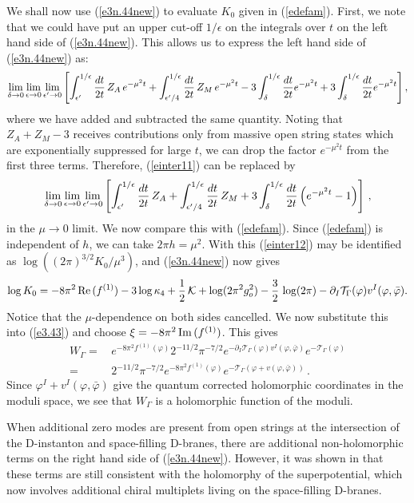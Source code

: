 \documentclass[12pt,a4paper]{article}
\newcommand{\be}{\begin{equation}}
\newcommand{\ee}{\end{equation}}
\newcommand{\refb}[1]{(\ref{#1})}
\newcommand{\p}{\partial}
\def\Im{\,{\rm Im}\,}
\def\Re{\,{\rm Re}\,}
\def\({\left(}
\def\){\right)}
\def\[{\left[}
\def\]{\right]}
\newcommand{\eps}{\epsilon}
\newcommand{\vp}{\varphi}
\newcommand{\cK}{\mathcal{K}}
\newcommand{\cT}{\mathcal{T}}
\begin{document}
We shall now use \refb{e3n.44new} to evaluate $K_0$ given in \refb{edefam}.
First, we note that we could have put an upper cut-off $1/\eps$ on the integrals over $t$ on
the left hand side of \refb{e3n.44new}. This allows us to express the left hand side of
\refb{e3n.44new} as:
\be\label{einter11}
\lim_{\delta\to 0}\lim_{\eps\to 0} \lim_{\eps'\to 0}\[ \int_{\eps'}^{1/\eps} {dt\over 2t} \,  Z_A \, e^{-\mu^2 t}
+ \int_{\eps'/4}^{1/\eps} {dt\over 2t} \,  Z_M
\, e^{-\mu^2 t} -3\int_{\delta}^{1/\eps} {dt\over 2t}   e^{-\mu^2 t}
+ 3\int_{\delta}^{1/\eps} {dt\over 2t}   e^{-\mu^2 t} \],
\ee
where we have added and subtracted the same quantity.
Noting that $Z_A+Z_M-3$ receives contributions only from massive open string
states which are exponentially suppressed for large $t$,
we can drop the factor $e^{-\mu^2 t}$ from the first three terms.
Therefore, \refb{einter11} can be replaced by
\be\label{einter12}
\lim_{\delta\to 0}\lim_{\eps\to 0} \lim_{\eps'\to 0}\[ \int_{\eps'}^{1/\eps} {dt\over 2t} \,  Z_A
+ \int_{\eps'/4}^{1/\eps} {dt\over 2t} \,  Z_M
+ 3\int_{\delta}^{1/\eps} {dt\over 2t}   \(e^{-\mu^2 t}-1\) \] \, ,
\ee
in the $\mu\to 0$ limit. We now compare this with \refb{edefam}.
Since \refb{edefam} is independent of $h$, we can take $2\pi h=\mu^{2}$. With this \refb{einter12}
may be identified as $\log \((2\pi)^{3/2}K_0/\mu^3\)$, and \refb{e3n.44new} now gives
\be
\log K_0
= -8\pi^2 \Re(f^{(1)}) -{3} \log{\kappa_4} +\frac{1}{2}\,\cK
 + \log (2\pi^2 g_o^{2}) -{3\over 2}\, \log(2\pi) - \p_I\cT_\Gamma(\vp) v^I(\vp,\bar\vp) .
\ee
Notice that the $\mu$-dependence on both sides cancelled.
We now substitute this into \refb{e3.43} and choose $\xi=-8\pi^2 \Im(f^{(1)})$. This gives
\be
\begin{split}
W_\Gamma =&\,  e^{-8\pi^2 f^{(1)}(\vp)} 2^{-11/2} \pi^{-7/2} e^{- \p_I\cT_\Gamma(\vp) v^I(\vp,\bar\vp)}e^{-\cT_\Gamma(\vp)}
\\
=&\, 2^{-11/2} \pi^{-7/2}  e^{-8\pi^2 f^{(1)}(\vp)}
e^{-\cT_\Gamma(\vp + v(\vp,\bar\vp))}\, .
\end{split}
\ee
Since $\vp^I + v^I(\vp,\bar\vp)$ give the quantum corrected holomorphic coordinates in
the moduli space, we see that $W_\Gamma$ is a holomorphic function of the moduli.

When additional zero modes are present from open strings at the intersection of the D-instanton
and space-filling D-branes, there are additional non-holomorphic terms on the right hand side of
\refb{e3n.44new}. However, it was shown in \cite{Akerblom:2007uc}
that these terms are still consistent with the holomorphy of the superpotential,
which now involves additional chiral multiplets living on the space-filling D-branes.
\end{document}

